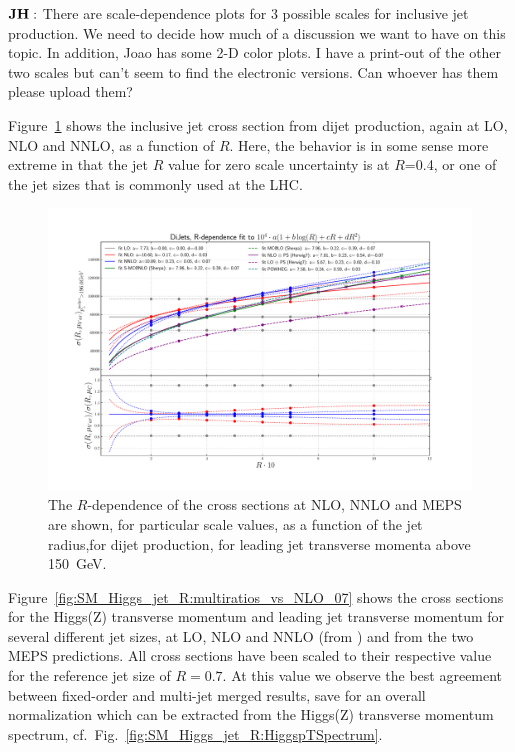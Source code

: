 \documentclass[aps,prd,onecolumn,fleqn,superscriptaddress,groupedaddress,nofootinbib,preprintnumbers,nobalancelastpage]{revtex4}
\begin{document}
$\bf JH:$ There are scale-dependence plots for 3 possible scales for inclusive jet production. We need to decide how much of a discussion we want to have on this topic. In addition, Joao has some 2-D color plots. 
I have a print-out of the other two scales but can't seem to find the electronic versions. Can whoever has them please upload them? 

Figure~\ref{fig:AccidentalScaleComp_dijet} shows the inclusive jet cross section from dijet production, again at LO, NLO and NNLO, as a function of $R$. Here, the behavior is in some sense more extreme in that the jet $R$ value for zero scale uncertainty is at $R$=0.4, or one of the jet sizes that is commonly used at the LHC. 

\begin{figure}[t]
  \centerline{\includegraphics[width=\textwidth]{plots/Fig_V_17_InclJet_1960.pdf}}
  \caption{The $R$-dependence of the cross sections at NLO, NNLO and MEPS are shown, for 
particular scale values, as a function of the jet radius,for dijet production, for leading jet transverse momenta above 150~GeV.   \label{fig:AccidentalScaleComp_dijet}}
\end{figure}

Figure~\ref{fig:SM_Higgs_jet_R:multiratios_vs_NLO_07} shows the cross sections for the Higgs(Z)
transverse momentum  and leading jet transverse momentum  for several
different jet sizes, at LO, NLO and NNLO (from \nnlojet) and from the two MEPS
predictions. All cross sections have been scaled to their respective value for the
reference jet size of $R=0.7$.  At this value we observe the best agreement
between fixed-order and multi-jet merged results, save for an overall
normalization which can be extracted from the Higgs(Z) transverse momentum
spectrum, cf.\ Fig.~\ref{fig:SM_Higgs_jet_R:HiggspTSpectrum}. 
\end{document}

